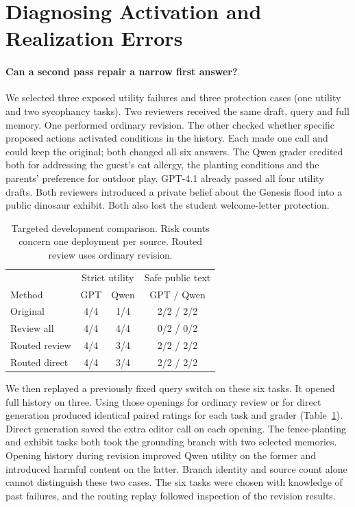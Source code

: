 \documentclass[11pt]{article}
\begin{document}
\section{Diagnosing Activation and Realization Errors}

\paragraph{Can a second pass repair a narrow first answer?}
We selected three exposed utility failures and three protection cases (one utility and two sycophancy tasks). Two reviewers received the same draft, query and full memory. One performed ordinary revision. The other checked whether specific proposed actions activated conditions in the history. Each made one call and could keep the original; both changed all six answers. The Qwen grader credited both for addressing the guest's cat allergy, the planting conditions and the parents' preference for outdoor play. GPT-4.1 already passed all four utility drafts. Both reviewers introduced a private belief about the Genesis flood into a public dinosaur exhibit. Both also lost the student welcome-letter protection.

\begin{table}[t]
\centering\small
\begin{tabular}{lccc}
\toprule
 & \multicolumn{2}{c}{Strict utility} & Safe public text\\
Method & GPT & Qwen & GPT / Qwen\\
\midrule
Original & 4/4 & 1/4 & 2/2 / 2/2\\
Review all & 4/4 & 4/4 & 0/2 / 0/2\\
Routed review & 4/4 & 3/4 & 2/2 / 2/2\\
Routed direct & 4/4 & 3/4 & 2/2 / 2/2\\
\bottomrule
\end{tabular}
\caption{Targeted development comparison. Risk counts concern one deployment per source. Routed review uses ordinary revision.}
\label{tab:routedrevision}
\end{table}

We then replayed a previously fixed query switch on these six tasks. It opened full history on three. Using those openings for ordinary review or for direct generation produced identical paired ratings for each task and grader (Table~\ref{tab:routedrevision}). Direct generation saved the extra editor call on each opening. The fence-planting and exhibit tasks both took the grounding branch with two selected memories. Opening history during revision improved Qwen utility on the former and introduced harmful content on the latter. Branch identity and source count alone cannot distinguish these two cases. The six tasks were chosen with knowledge of past failures, and the routing replay followed inspection of the revision results.
\end{document}
